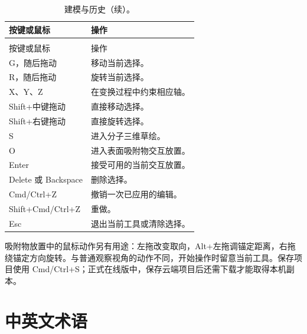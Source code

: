 \begin{longtable}{>{\raggedright\arraybackslash}p{.37\linewidth}>{\raggedright\arraybackslash}p{}}
\caption{建模与历史。}\\
\toprule
按键或鼠标 & 操作 \\
\midrule
\endfirsthead
\caption[]{建模与历史（续）。}\\
\toprule
按键或鼠标 & 操作 \\
\midrule
\endhead
\bottomrule
\endfoot
\bottomrule
\endlastfoot
G，随后拖动 & 移动当前选择。\\
R，随后拖动 & 旋转当前选择。\\
X、Y、Z & 在变换过程中约束相应轴。\\
Shift+中键拖动 & 直接移动选择。\\
Shift+右键拖动 & 直接旋转选择。\\
S & 进入分子三维草绘。\\
O & 进入表面吸附物交互放置。\\
Enter & 接受可用的当前交互放置。\\
Delete 或 Backspace & 删除选择。\\
Cmd/Ctrl+Z & 撤销一次已应用的编辑。\\
Shift+Cmd/Ctrl+Z & 重做。\\
Esc & 退出当前工具或清除选择。\\
\end{longtable}

吸附物放置中的鼠标动作另有用途：左拖改变取向，Alt+左拖调锚定距离，右拖绕锚定方向旋转。与普通观察视角的动作不同，开始操作时留意当前工具。保存项目使用 Cmd/Ctrl+S；正式在线版中，保存云端项目后还需下载才能取得本机副本。

\Needspace{145mm}
\section{中英文术语}

